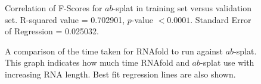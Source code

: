 \documentclass{cshonours}
\begin{document}
\begin{figure}
\begin{center}
\end{center}
\caption{Correlation of F-Scores for $ab$-splat in training set versus validation set. R-squared value = 0.702901, $p$-value $< 0.0001$. Standard Error of Regression = 0.025032.}
\label{fig:abcorrelation}
\end{figure}



\begin{figure}
\begin{center}
\end{center}
\caption{A comparison of the time taken for RNAfold to run against $ab$-splat. This graph indicates how much time RNAfold and $ab$-splat use with increasing RNA length. Best fit regression lines are also shown.}
\label{fig:zukerabtime}
\end{figure}
\end{document}
